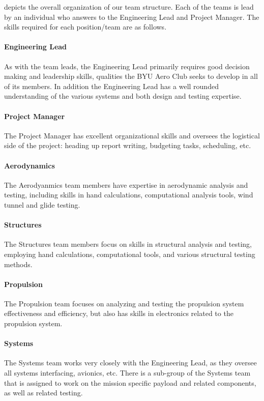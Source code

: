 \documentclass[report]{byu-aero}
\begin{document}


 depicts the overall organization of our team structure.  Each of the teams is lead by an individual who answers to the Engineering Lead and Project Manager.  The skills required for each position/team are as follows.

\paragraph{Engineering Lead} As with the team leads, the Engineering Lead primarily requires good decision making and leadership skills, qualities the BYU Aero Club seeks to develop in all of its members.  In addition the Engineering Lead has a well rounded understanding of the various systems and both design and testing expertise.
\paragraph{Project Manager} The Project Manager has excellent organizational skills  and oversees the logistical side of the project: heading up report writing, budgeting tasks, scheduling, etc.
\paragraph{Aerodynamics} The Aerodyanmics team members have expertise in aerodynamic analysis and testing, including skills in hand calculations, computational analysis tools, wind tunnel and glide testing.
\paragraph{Structures} The Structures team members focus on skills in structural analysis and testing, employing hand calculations, computational tools, and various structural testing methods.
\paragraph{Propulsion} The Propulsion team focuses on analyzing and testing the propulsion system effectiveness and efficiency, but also has skills in electronics related to the propulsion system.
\paragraph{Systems} The Systems team works very closely with the Engineering Lead, as they oversee all systems interfacing, avionics, etc.  There is a sub-group of the Systems team that is assigned to work on the mission specific payload and related components, as well as related testing. %
\end{document}
